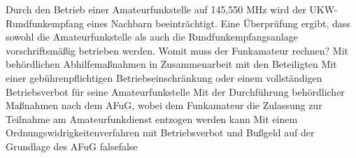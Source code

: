     {Durch den Betrieb einer Amateurfunkstelle auf 145,550 MHz wird der UKW-Rundfunkempfang eines Nachbarn beeinträchtigt. Eine Überprüfung ergibt, dass sowohl die Amateurfunkstelle als auch die Rundfunkempfangsanlage vorschriftsmäßig betrieben werden. Womit muss der Funkamateur rechnen?}
    {Mit behördlichen Abhilfemaßnahmen in Zusammenarbeit mit den Beteiligten}
    {Mit einer gebührenpflichtigen Betriebseinschränkung oder einem vollständigen Betriebsverbot für seine Amateurfunkstelle}
    {Mit der Durchführung behördlicher Maßnahmen nach dem AFuG, wobei dem Funkamateur die Zulassung zur Teilnahme am Amateurfunkdienst entzogen werden kann}
    {Mit einem Ordnungswidrigkeitenverfahren mit Betriebsverbot und Bußgeld auf der Grundlage des AFuG}
    {false}{false}